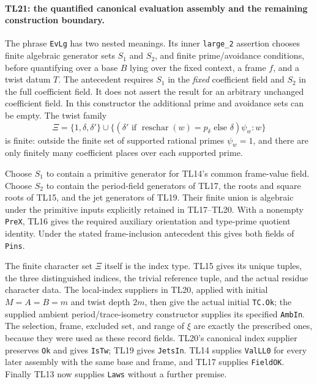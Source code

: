 \paragraph{TL21: the quantified canonical evaluation assembly and
the remaining construction boundary.}
The phrase \texttt{EvLg} has two nested meanings. Its inner
\texttt{large\_2} assertion chooses finite algebraic generator
sets $S_1$ and $S_2$, and finite prime/avoidance conditions,
before quantifying over a base $B$ lying over the fixed context,
a frame $f$, and a twist datum $T$. The antecedent requires
$S_1$ in the \emph{fixed} coefficient field and $S_2$ in the full
coefficient field. It does not assert the result for an arbitrary
unchanged coefficient field. In this constructor the additional
prime and avoidance sets can be empty. The twist family
\[
 \Xi=\{1,\delta,\delta'\}\cup
       \{(\delta'\text{ if }\operatorname{reschar}(w)=p_\delta
                      \text{ else }\delta)\psi_w:w\}
 \tag{TL.22}
\]
is finite: outside the finite set of supported rational primes
$\psi_w=1$, and there are only finitely many coefficient places
over each supported prime.

Choose $S_1$ to contain a primitive generator for TL14's common
frame-value field. Choose $S_2$ to contain the period-field
generators of TL17, the roots and square roots of TL15, and the
jet generators of TL19. Their finite union is algebraic under
the primitive inputs explicitly retained in TL17--TL20.
With a nonempty \texttt{PreX}, TL16 gives the required auxiliary
orientation and type-prime quotient identity. Under the stated
frame-inclusion antecedent this gives both fields of
\texttt{Pins}.

The finite character set $\Xi$ itself is the index type. TL15
gives its unique tuples, the three distinguished indices, the
trivial reference tuple, and the actual residue character data.
The local-index suppliers in TL20, applied with initial
$M=A=B=m$ and twist depth $2m$, then give the actual initial
\texttt{TC.Ok}; the supplied ambient period/trace-isometry
constructor supplies its specified \texttt{AmbIn}. The selection,
frame, excluded set, and range of $\xi$ are exactly the prescribed
ones, because they were used as these record fields. TL20's
canonical index supplier preserves \texttt{Ok} and gives
\texttt{IsTw}; TL19 gives \texttt{JetsIn}. TL14 supplies
\texttt{ValLL0} for every later assembly with the same base and
frame, and TL17 supplies \texttt{FieldOK}. Finally TL13 now
supplies \texttt{Laws} without a further premise.

